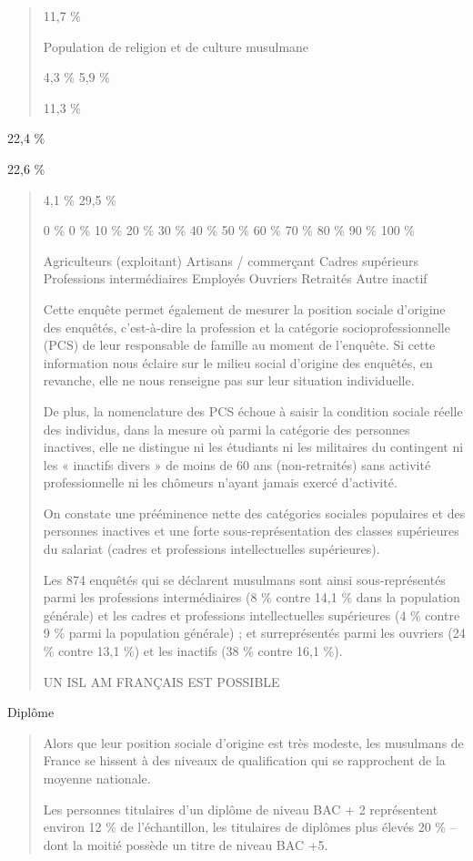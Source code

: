 \begin{quote}
11,7 \%

Population de religion et de culture musulmane

4,3 \% 5,9 \%

11,3 \%
\end{quote}

22,4 \%

22,6 \%

\begin{quote}
4,1 \% 29,5 \%

0 \% 0 \% 10 \% 20 \% 30 \% 40 \% 50 \% 60 \% 70 \% 80 \% 90 \% 100 \%

Agriculteurs (exploitant) Artisans / commerçant Cadres supérieurs
Professions intermédiaires Employés Ouvriers Retraités Autre inactif

Cette enquête permet également de mesurer la position sociale d'origine
des enquêtés, c'est-à-dire la profession et la catégorie
socioprofessionnelle (PCS) de leur responsable de famille au moment de
l'enquête. Si cette information nous éclaire sur le milieu social
d'origine des enquêtés, en revanche, elle ne nous renseigne pas sur leur
situation individuelle.

De plus, la nomenclature des PCS échoue à saisir la condition sociale
réelle des individus, dans la mesure où parmi la catégorie des personnes
inactives, elle ne distingue ni les étudiants ni les militaires du
contingent ni les « inactifs divers » de moins de 60 ans (non-retraités)
sans activité professionnelle ni les chômeurs n'ayant jamais exercé
d'activité.

On constate une prééminence nette des catégories sociales populaires et
des personnes inactives et une forte sous-représentation des classes
supérieures du salariat (cadres et professions intellectuelles
supérieures).

Les 874 enquêtés qui se déclarent musulmans sont ainsi sous-représentés
parmi les professions intermédiaires (8 \% contre 14,1 \% dans la
population générale) et les cadres et professions intellectuelles
supérieures (4 \% contre 9 \% parmi la population générale) ; et
surreprésentés parmi les ouvriers (24 \% contre 13,1 \%) et les inactifs
(38 \% contre 16,1 \%).

UN ISL AM FRANÇAIS EST POSSIBLE
\end{quote}

Diplôme

\begin{quote}
Alors que leur position sociale d'origine est très modeste, les
musulmans de France se hissent à des niveaux de qualification qui se
rapprochent de la moyenne nationale.

Les personnes titulaires d'un diplôme de niveau BAC + 2 représentent
environ 12 \% de l'échantillon, les titulaires de diplômes plus élevés
20 \% -- dont la moitié possède un titre de niveau BAC +5.
\end{quote}

